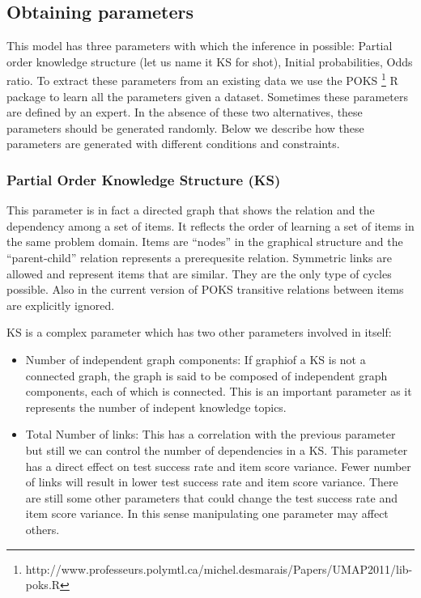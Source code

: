 \subsection{Obtaining parameters}
This model has three parameters with which the inference in possible: Partial order knowledge structure (let us name it KS for shot), Initial probabilities, Odds ratio. To extract these parameters from an existing data we use the POKS \footnote{http://www.professeurs.polymtl.ca/michel.desmarais/Papers/UMAP2011/lib-poks.R} R package to learn all the parameters given a dataset. Sometimes these parameters are defined by an expert. In the absence of these two alternatives, these parameters should be generated randomly. Below we describe how these parameters are generated with different conditions and constraints.

\subsubsection{Partial Order Knowledge Structure (KS)}
This parameter is in fact a directed graph that shows the relation and the dependency among a set of items. It reflects the order of learning a set of items in the same problem domain. Items are ``nodes'' in the graphical structure and the ``parent-child'' relation represents a prerequesite relation.  Symmetric links are allowed and represent items that are similar.  They are the only type of cycles possible. Also in the current version of POKS transitive relations between items are explicitly ignored. 

KS is a complex parameter which has two other parameters involved in itself:
\begin{itemize}
\item Number of independent graph components: If graphiof a KS is not a connected graph, the graph is said to be composed of independent graph components, each of which is connected.  This is an important parameter as it represents the number of indepent knowledge topics.
\item Total Number of links: This has a correlation with the previous parameter but still we can control the number of dependencies in a KS. This parameter has a direct effect on test success rate and item score variance. Fewer number of links will result in lower test success rate and item score variance. There are still some other parameters that could change the test success rate and item score variance. In this sense manipulating one parameter may affect others.
\end{itemize} 

